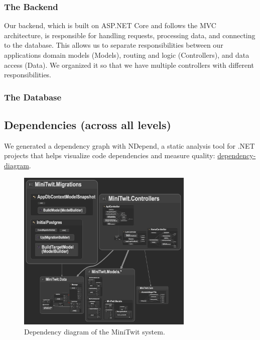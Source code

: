 \documentclass[12pt,a4paper,reqno]{report}
\begin{document}
\subsubsection{The Backend}
Our backend, which is built on ASP.NET Core and follows the MVC architecture, is responsible for handling requests, processing data, and connecting to the database. This allows us to separate responsibilities between our applications domain models (Models), routing and logic (Controllers), and data access (Data). We organized it so that we have multiple controllers with different responsibilities.

\subsubsection{The Database}

\subsection{Dependencies (across all levels)}

We generated a dependency graph with NDepend, a static analysis tool for .NET projects that helps visualize code dependencies and measure quality: \href{http://67.207.72.20:8081/NDependReportFiles/ComponentDependenciesDiagram.html}{dependency-diagram}.

\vspace*{0.5cm}

\begin{figure}[h!]
    \centering
    \includegraphics[width=0.75\textwidth]{images/MiniTwit-DependencyDiagram.png}
    \caption{Dependency diagram of the MiniTwit system.}
    \label{fig:minitwit-diagram}
\end{figure}
\end{document}
